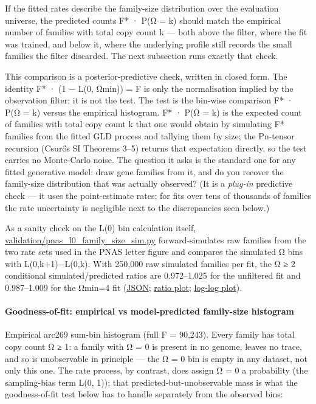 \documentclass[
  10pt,
]{article}
\begin{document}
If the fitted rates describe the family-size distribution over the
evaluation universe, the predicted counts F* · P(Ω = k) should match the
empirical number of families with total copy count k --- both above the
filter, where the fit was trained, and below it, where the underlying
profile still records the small families the filter discarded. The next
subsection runs exactly that check.

This comparison is a posterior-predictive check, written in closed form.
The identity F* · (1 − L(0, Ωmin)) = F is only the normalisation implied
by the observation filter; it is not the test. The test is the bin-wise
comparison F* · P(Ω = k) versus the empirical histogram. F* · P(Ω = k)
is the expected count of families with total copy count k that one would
obtain by simulating F* families from the fitted GLD process and
tallying them by size; the Pn-tensor recursion (Csurős SI Theorems 3--5)
returns that expectation directly, so the test carries no Monte-Carlo
noise. The question it asks is the standard one for any fitted
generative model: draw gene families from it, and do you recover the
family-size distribution that was actually observed? (It is a
\emph{plug-in} predictive check --- it uses the point-estimate rates;
for fits over tens of thousands of families the rate uncertainty is
negligible next to the discrepancies seen below.)

As a sanity check on the L(0) bin calculation itself,
\url{validation/pnas_l0_family_size_sim.py} forward-simulates raw
families from the two rate sets used in the PNAS letter figure and
compares the simulated Ω bins with L(0,k+1)−L(0,k). With 250,000 raw
simulated families per fit, the Ω ≥ 2 conditional simulated/predicted
ratios are 0.972--1.025 for the unfiltered fit and 0.987--1.009 for the
Ωmin=4 fit
(\href{validation/results/pnas_l0_family_size_sim.json}{JSON};
\href{validation/results/pnas_l0_family_size_sim.png}{ratio plot};
\href{validation/results/pnas_l0_family_size_sim_loglog.png}{log-log
plot}).

\paragraph{Goodness-of-fit: empirical vs model-predicted family-size
histogram}\label{goodness-of-fit-empirical-vs-model-predicted-family-size-histogram}

Empirical arc269 sum-bin histogram (full F = 90,243). Every family has
total copy count Ω ≥ 1: a family with Ω = 0 is present in no genome,
leaves no trace, and so is unobservable in principle --- the Ω = 0 bin
is empty in any dataset, not only this one. The rate process, by
contrast, does assign Ω = 0 a probability (the sampling-bias term L(0,
1)); that predicted-but-unobservable mass is what the goodness-of-fit
test below has to handle separately from the observed bins:
\end{document}
